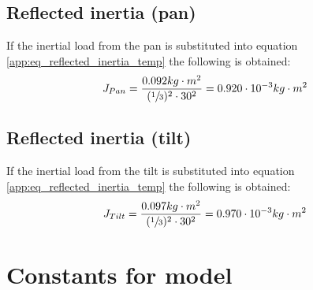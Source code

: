 \subsection{Reflected inertia (pan)}
If the inertial load from the pan is substituted into equation \ref{app:eq_reflected_inertia_temp} the following is obtained:
\begin{equation}
	J_{Pan} = \frac{0.092 kg \cdot m^{2}}{(\sfrac{1}{3})^{2} \cdot 30^{2}} = 0.920 \cdot 10^{-3} kg \cdot m^{2} \label{app:eq_reflected_pan_inertia}
\end{equation}

\subsection{Reflected inertia (tilt)}
If the inertial load from the tilt is substituted into equation \ref{app:eq_reflected_inertia_temp} the following is obtained:
\begin{equation}
	J_{Tilt} = \frac{0.097 kg \cdot m^{2}}{(\sfrac{1}{3})^{2} \cdot 30^{2}} = 0.970 \cdot 10^{-3} kg \cdot m^{2} \label{app:eq_reflected_pan_inertia}
\end{equation} 

\section{Constants for model}
